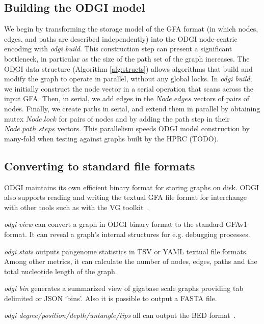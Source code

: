 \documentclass{bioinfo}
\begin{document}
\subsection{Building the \textsc{ODGI} model}
\label{sec:build}

We begin by transforming the storage model of the GFA format (in which nodes, edges, and paths are described independently) into the ODGI node-centric encoding with \textit{odgi build}.
This construction step can present a significant bottleneck, in particular as the size of the path set of the graph increases.
The ODGI data structure (Algorithm \ref{alg:structs}) allows algorithms that build and modify the graph to operate in parallel, without any global locks.
In \textit{odgi build}, we initially construct the node vector in a serial operation that scans across the input GFA. Then, in serial, we add edges in the $Node.edges$ vectors of pairs of nodes. Finally, we create paths in serial, and extend them in parallel by obtaining mutex $Node.lock$ for pairs of nodes and by adding the path step in their $Node.path\_steps$ vectors.
This parallelism speeds ODGI model construction by many-fold when testing against graphs built by the HPRC (TODO).


\subsection{Converting to standard file formats}
\label{sec:text}

ODGI maintains its own efficient binary format for storing graphs on disk.
ODGI also supports reading and writing the textual GFA file format for interchange with other tools such as with the VG toolkit~\citep{Garrison:2018}.

\textit{odgi view} can convert a graph in ODGI binary format to the standard GFAv1 format. It can reveal a graph’s internal structures for e.g. debugging processes.

\textit{odgi stats} outputs pangenome statistics in TSV or YAML textual file formats.
Among other metrics, it can calculate the number of nodes, edges, paths and the total nucleotide length of the graph.

\textit{odgi bin} generates a summarized view of gigabase scale graphs providing tab delimited or JSON `bins'. Also it is possible to output a FASTA file.

\textit{odgi degree/position/depth/untangle/tips} all can output the BED format~\citep{Quinlan_2010}.
\end{document}
